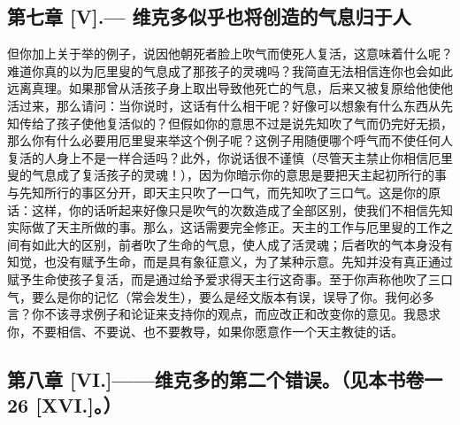 
\subsection{第七章 [V].— 维克多似乎也将创造的气息归于人}

但你加上关于举的例子，说因他朝死者脸上吹气而使死人复活，这意味着什么呢？ 难道你真的以为厄里叟的气息成了那孩子的灵魂吗？我简直无法相信连你也会如此远离真理。如果那曾从活孩子身上取出导致他死亡的气息，后来又被复原给他使他活过来，那么请问：当你说时，这话有什么相干呢？好像可以想象有什么东西从先知传给了孩子使他复活似的？但假如你的意思不过是说先知吹了气而仍完好无损，那么你有什么必要用厄里叟来举这个例子呢？这例子用随便哪个呼气而不使任何人复活的人身上不是一样合适吗？此外，你说话很不谨慎（尽管天主禁止你相信厄里叟的气息成了复活孩子的灵魂！），因为你暗示你的意思是要把天主起初所行的事与先知所行的事区分开，即天主只吹了一口气，而先知吹了三口气。这是你的原话：这样，你的话听起来好像只是吹气的次数造成了全部区别，使我们不相信先知实际做了天主所做的事。那么，这话需要完全修正。天主的工作与厄里叟的工作之间有如此大的区别，前者吹了生命的气息，使人成了活灵魂；后者吹的气本身没有知觉，也没有赋予生命，而是具有象征意义，为了某种示意。先知并没有真正通过赋予生命使孩子复活，而是通过给予爱求得天主行这奇事。至于你声称他吹了三口气，要么是你的记忆（常会发生），要么是经文版本有误，误导了你。我何必多言？你不该寻求例子和论证来支持你的观点，而应改正和改变你的意见。我恳求你，不要相信、不要说、也不要教导，如果你愿意作一个天主教徒的话。\par


\subsection{第八章 [VI.]——维克多的第二个错误。（见本书卷一 26 [XVI.]。）}

